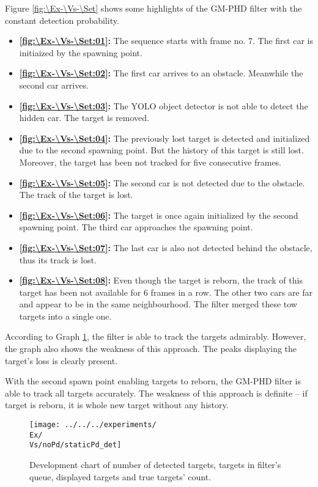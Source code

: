 Figure \ref{fig:\Ex-\Vs-\Set} shows some highlights of the GM-PHD filter with the constant detection probability.
\begin{itemize}
    \item \textbf{\ref{fig:\Ex-\Vs-\Set:01}:} The sequence starts with frame no. 7. The first car is initiaized by the spawning point.
    \item \textbf{\ref{fig:\Ex-\Vs-\Set:02}:} The first car arrives to an obstacle. Meanwhile the second car arrives.
    \item \textbf{\ref{fig:\Ex-\Vs-\Set:03}:} The YOLO object detector is not able to detect the hidden car. The target is removed.
    \item \textbf{\ref{fig:\Ex-\Vs-\Set:04}:} The previously lost target is detected and initialized due to the second spawning point. But the history of this target is still lost. Moreover, the target has been not tracked for five consecutive frames.
    \item \textbf{\ref{fig:\Ex-\Vs-\Set:05}:} The second car is not detected due to the obstacle. The track of the target is lost.
    \item \textbf{\ref{fig:\Ex-\Vs-\Set:06}:} The target is once again initialized by the second spawning point. The third car approaches the spawning point.
    \item \textbf{\ref{fig:\Ex-\Vs-\Set:07}:} The last car is also not detected behind the obstacle, thus its track is lost.
    \item \textbf{\ref{fig:\Ex-\Vs-\Set:08}:} Even though the target is reborn, the track of this target has been not available for 6 frames in a row. The other two cars are far and appear to be in the same neighbourhood. The filter merged these tow targets into a single one.
\end{itemize}

According to Graph \ref{gr:\Ex-\Vs-\Set}, the filter is able to track the targets admirably. However, the graph also shows the weakness of this approach. The peaks displaying the target's loss is clearly present.

With the second spawn point enabling targets to reborn, the GM-PHD filter is able to track all targets accurately. The weakness of this approach is definite -- if target is reborn, it is whole new target without any history.

\begin{figure}[H]
    \centering
    \texttt{[image: ../../../experiments/\\Ex/\\Vs/noPd/staticPd\_det]}
    \caption{Development chart of number of detected targets, targets in filter's queue, displayed targets and true targets' count.}
    \label{gr:\Ex-\Vs-\Set}
\end{figure}

